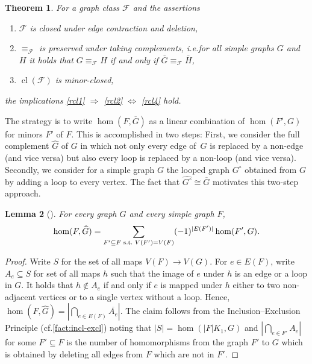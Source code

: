 \documentclass[3p,final]{elsarticle}
\DeclareMathOperator{\cl}{cl}
\newtheorem{theorem}{Theorem}
\newtheorem{lemma}[theorem]{Lemma}
\begin{document}
	\begin{theorem}
		\label{thm:complement}
		For a graph class $\mathcal{F}$ and the assertions
		\begin{enumerate}
			\item $\mathcal{F}$ is closed under edge contraction and deletion,\label{rcl1}
			\item $\equiv_{\mathcal{F}}$ is \emph{preserved under taking complements}, i.e.\@ for all simple graphs $G$ and $H$ it holds that $G \equiv_{\mathcal{F}} H$ if and only if $\overline{G} \equiv_{\mathcal{F}} \overline{H}$,\label{rcl2}
			\item $\cl(\mathcal{F})$ is minor-closed,\label{rcl4}
		\end{enumerate}
		the implications \ref{rcl1} $\Rightarrow$ \ref{rcl2} %
		$\Leftrightarrow$ \ref{rcl4} hold.
	\end{theorem}

	The strategy is to write $\hom(F, \overline{G})$ as a linear combination of $\hom(F', G)$ for minors $F'$ of $F$.
	This is accomplished in two steps: First, we consider the full complement $\widehat{G}$ of $G$ in which not only every edge of~$G$ is replaced by a non-edge (and vice versa) but also every loop is replaced by a non-loop (and vice versa). Secondly, we consider for a simple graph $G$ the looped graph $G^\circ$ obtained from $G$ by adding a loop to every vertex.
	The fact that $\widehat{G^\circ} \cong \overline{G}$ motivates this two-step approach. 
	
	\begin{lemma}[{\cite[Equation~(5.23)]{lovasz_large_2012}}] \label{eq:complement}
		For every  graph $G$ and every simple graph $F$,
		\[
		\hom(F, \widehat{G}) = \sum_{F' \subseteq F \text{ s.t.\@ }V(F') = V(F)} (-1)^{|E(F')|} \hom(F', G).
		\]
	\end{lemma}
	\begin{proof}%
		Write $S$ for the set of all maps $V(F) \to V(G)$. For $e \in E(F)$, write $A_e \subseteq S$ for set of all maps $h$ such that the image of $e$ under $h$ is an edge or a loop in $G$.
		It holds that $h \not\in A_e$ if and only if $e$ is mapped under $h$ either to two non-adjacent vertices or to a single vertex without a loop.
		Hence, $\hom(F, \widehat{G}) = \left\lvert \bigcap_{e \in E(F)} \overline{A_e} \right\rvert$.
		The claim follows from the Inclusion--Exclusion Principle (cf.\@ \cref{fact:incl-excl}) noting that $|S| = \hom(|F|K_1, G)$ and $\left\lvert \bigcap_{e \in F'} A_e \right\rvert$ for some $F' \subseteq F$ is the number of homomorphisms from the graph $F'$ to $G$ which is obtained by deleting all edges from $F$ which are not in $F'$.
	\end{proof}
	
\end{document}
